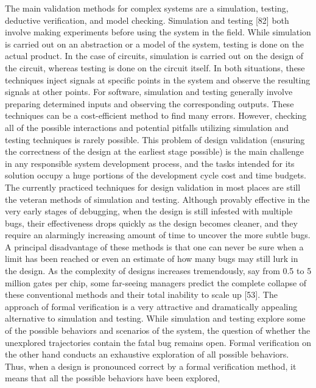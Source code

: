 \documentclass{article}
\begin{document}
		
		The main validation methods for complex systems are a simulation, testing, deductive verification,
		and model checking. Simulation and testing [82] both involve making experiments
		before using the system in the field. While simulation is carried out on an abstraction or a
		model of the system, testing is done on the actual product. In the case of circuits, simulation
		is carried out on the design of the circuit, whereas testing is done on the circuit itself. In
		both situations, these techniques inject signals at specific points in the system and observe
		the resulting signals at other points. For software, simulation and testing generally involve
		preparing determined inputs and observing the corresponding outputs. These techniques
		can be a cost-efficient method to find many errors. However, checking all of the possible
		interactions and potential pitfalls utilizing simulation and testing techniques is rarely
		possible.
		This problem of design validation (ensuring the correctness of the design at the earliest
		stage possible) is the main challenge in any responsible system development process, and
		the tasks intended for its solution occupy a huge portions of the development cycle cost
		and time budgets. The currently practiced techniques for design validation in most places
		are still the veteran methods of simulation and testing. Although provably effective in the
		very early stages of debugging, when the design is still infested with multiple bugs, their
		effectiveness drops quickly as the design becomes cleaner, and they require an alarmingly
		increasing amount of time to uncover the more subtle bugs.
		A principal disadvantage of these methods is that one can never be sure when a limit
		has been reached or even an estimate of how many bugs may still lurk in the design. As the
		complexity of designs increases tremendously, say from 0.5 to 5 million gates per chip, some
		far-seeing managers predict the complete collapse of these conventional methods and their
		total inability to scale up [53].
		The approach of formal verification is a very attractive and dramatically appealing alternative
		to simulation and testing. While simulation and testing explore some of the possible
		behaviors and scenarios of the system, the question of whether the unexplored trajectories
		contain the fatal bug remains open. Formal verification on the other hand conducts an
		exhaustive exploration of all possible behaviors. Thus, when a design is pronounced correct
		by a formal verification method, it means that all the possible behaviors have been explored,
\end{document}

